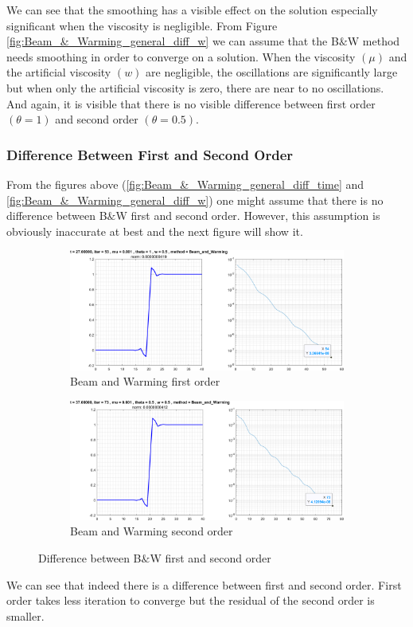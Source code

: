 \documentclass[11pt, a4paper]{article}
\begin{document}
We can see that the smoothing has a visible effect on the solution especially  significant when the viscosity is negligible. From Figure \ref{fig:Beam_&_Warming_general_diff_w} we can assume that the B$\&$W method needs smoothing in order to converge on a solution. When the viscosity $\left(\mu\right)$ and the artificial viscosity $\left(w\right)$ are negligible, the oscillations are significantly large but when only the artificial viscosity is zero, there are near to no oscillations. And again, it is visible that there is no visible difference between first order $\left(\theta=1\right)$ and second order $\left(\theta=0.5\right)$.

\subsubsection{Difference Between First and Second Order}
From the figures above (\ref{fig:Beam_&_Warming_general_diff_time} and \ref{fig:Beam_&_Warming_general_diff_w}) one might assume that there is no difference between B$\&$W first and second order. However, this assumption is obviously inaccurate at best and the next figure will show it.
\begin{figure}[H]
    \centering
    \begin{subfigure}[c]{\textwidth}
        \centering
        \includegraphics[width=\textwidth]{images/B&W first.png}
        \caption{Beam and Warming first order}
        \label{fig:B&W_1vs2_A}
    \end{subfigure}
    \hfill
    \begin{subfigure}[c]{\textwidth}
        \centering
        \includegraphics[width=\textwidth]{images/B&W second.png}
        \caption{Beam and Warming second order}
        \label{fig:B&W_1vs2_B}
    \end{subfigure}
    \caption{Difference between B$\&$W first and second order}
        \label{fig:B&W_1vs2}
\end{figure}
\noindent We can see that indeed there is a difference between first and second order. First order takes less iteration to converge but the residual of the second order is smaller.
\end{document}
